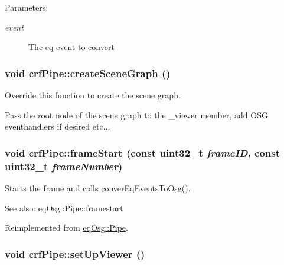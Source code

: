 \begin{Desc}
\item[Parameters:]
\begin{description}
\item[{\em event}]The eq event to convert \end{description}
\end{Desc}
\hypertarget{a00006_44e473d6aa40bdb24ae85f1dfd1f973d}{
\subsubsection[{createSceneGraph}]{\setlength{\rightskip}{0pt plus 5cm}void crfPipe::createSceneGraph ()}}
\label{a00006_44e473d6aa40bdb24ae85f1dfd1f973d}


Override this function to create the scene graph. 

Pass the root node of the scene graph to the \_\-viewer member, add OSG eventhandlers if desired etc... \hypertarget{a00006_2e551fe08841da2b7a1def541656d48c}{
\subsubsection[{frameStart}]{\setlength{\rightskip}{0pt plus 5cm}void crfPipe::frameStart (const uint32\_\-t {\em frameID}, \/  const uint32\_\-t {\em frameNumber})}}
\label{a00006_2e551fe08841da2b7a1def541656d48c}


Starts the frame and calls converEqEventsToOsg(). 

\begin{Desc}
\item[See also:]eqOsg::Pipe::framestart \end{Desc}


Reimplemented from \hyperlink{a00014_6be431b1b9fe04da31596ea8b870dfde}{eqOsg::Pipe}.\hypertarget{a00006_44ac49a7ba2b74a56b00177009d09c93}{
\subsubsection[{setUpViewer}]{\setlength{\rightskip}{0pt plus 5cm}void crfPipe::setUpViewer ()}}
\label{a00006_44ac49a7ba2b74a56b00177009d09c93}


